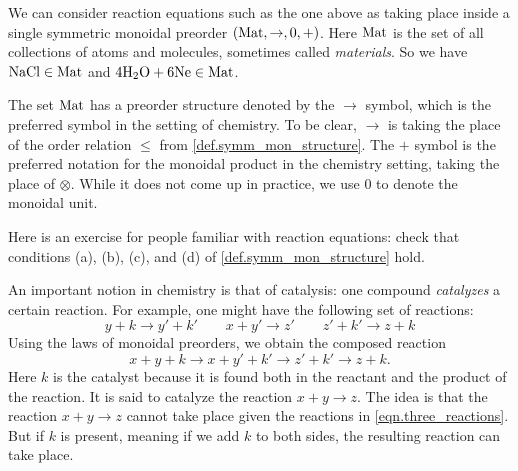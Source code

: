 \documentclass[7Sketches]{subfiles}
\begin{document}
We can consider reaction equations such as the one above as taking place inside a single symmetric monoidal preorder $(\mathrm{Mat},\to,0,+)$. Here $\mathrm{Mat}$ is the set of all collections of atoms and molecules, sometimes called \emph{materials}. So we have $\mathrm{NaCl}\in\mathrm{Mat}$ and $\mathrm{4H_2O+6Ne}\in\mathrm{Mat}$.

The set $\mathrm{Mat}$ has a preorder structure denoted by the $\to$ symbol, which is the preferred symbol in the setting of chemistry. To be clear, $\to$ is taking the place of the order relation $\leq$ from \cref{def.symm_mon_structure}. The $+$ symbol is the preferred notation for the monoidal product in the chemistry setting, taking the place of $\otimes$. While it does not come up in practice, we use $0$ to denote the monoidal unit.

\begin{exercise} %
\label{exc.reaction_equations}
Here is an exercise for people familiar with reaction equations: check that
conditions (a), (b), (c), and (d) of \cref{def.symm_mon_structure} hold.
\end{exercise}

%
An important notion in chemistry is that of catalysis: one compound \emph{catalyzes} a certain reaction. For example, one might have the following set of reactions:
\begin{equation}%
\label{eqn.three_reactions}
  y+k\to y'+k'\qquad x+y'\to z'\qquad z'+k'\to z+k
\end{equation}
Using the laws of monoidal preorders, we obtain the composed reaction
\begin{equation}%
\label{eqn.result_reaction}
	x+y+k\to x+y'+k'\to z'+k'\to z+k.
\end{equation}
Here $k$ is the catalyst because it is found both in the reactant and the product of the reaction. It is said to catalyze the reaction $x+y\to z$. The idea is that the reaction $x+y\to z$ cannot take place given the reactions in \cref{eqn.three_reactions}. But if $k$ is present, meaning if we add $k$ to both sides, the resulting reaction can take place.
\end{document}

